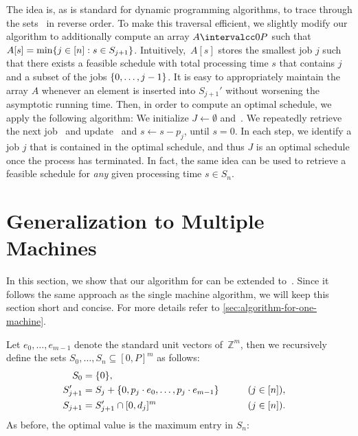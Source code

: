 \documentclass[10pt,a4paper]{article}
\newcommand\Int{\mathbb Z}
\DeclarePairedDelimiter\set{\lbrace}{\rbrace}
\DeclareMathOperator\OPT{OPT}
\newcommand\MTPT{\smash{$1||\sum p_j U_j$}}
\newcommand\mMTPT{\smash{$P_m||\sum p_j U_j$}}
\begin{document}
The idea is, as is standard for dynamic programming algorithms, to trace through the sets~ in reverse order. To make this traversal efficient, we slightly modify our algorithm to additionally compute an array $A \intervalcc0P$ such that $A[s] = \min\set{j \in [n] : s \in S_{j+1}}$. Intuitively,~$A[s]$ stores the smallest job $j$ such that there exists a feasible schedule with total processing time $s$ that contains $j$ and a subset of the jobs $\set{0, \dots, j-1}$. It is easy to appropriately maintain the array $A$ whenever an element is inserted into $S_{j+1}'$ without worsening the asymptotic running time. Then, in order to compute an optimal schedule, we apply the following algorithm: We initialize $J \gets \emptyset$ and~\smash{$s \gets \OPT$}. We repeatedly retrieve the next job~ and update~ and $s \gets s - p_j$, until $s = 0$. In each step, we identify a job $j$ that is contained in the optimal schedule, and thus $J$ is an optimal schedule once the process has terminated. In fact, the same idea can be used to retrieve a feasible schedule for \emph{any} given processing time $s \in S_n$.




\section{Generalization to Multiple Machines}
\label{sec:manymachines}

In this section, we show that our algorithm for \MTPT{} can be extended to~\mMTPT{}. Since it follows the same approach as the single machine algorithm, we will keep this section short and concise.
For more details refer to \cref{sec:algorithm-for-one-machine}.

Let $e_0, \dots, e_{m-1}$ denote the standard unit vectors of~$\Int^m$, then we recursively define the sets $S_0, \dots, S_n \subseteq [0, P]^m$ as follows:
\begin{alignat*}{2}
    S_0 &= \set{0}, \\
    S_{j+1}' &= S_{j} + \set{0, p_j \cdot e_0, \dots, p_j \cdot e_{m-1}} \qquad &&(j \in [n]),  \\
    S_{j+1} &= S_{j+1}' \cap [0, d_j]^m \qquad &&(j \in [n]). 
\end{alignat*}
As before, the optimal value is the maximum entry in $S_n$:
\end{document}
